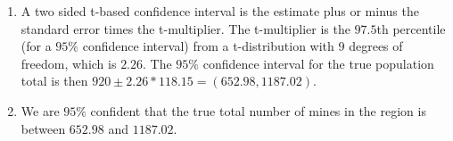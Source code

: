 \documentclass[11pt]{article}
\begin{document}
\begin{doublespace}
\begin{enumerate}
\begin{enumerate}
\item A two sided t-based confidence interval is the estimate plus or minus the standard error times the t-multiplier. The t-multiplier is the $97.5$th percentile (for a $95\%$ confidence interval) from a t-distribution with $9$ degrees of freedom, which is $2.26$. The $95\%$ confidence interval for the true population total is then $920 \pm 2.26*118.15 = (652.98, 1187.02)$.

\item We are $95\%$ confident that the true total number of mines in the region is between $652.98$ and $1187.02$.

\end{enumerate}

\end{enumerate}

\end{doublespace}
\end{document}
